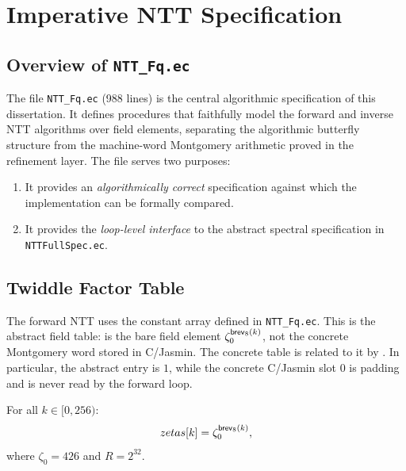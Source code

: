 
\chapter{Imperative NTT Specification}
\label{ch:ntt_spec}

\section{Overview of \texttt{NTT\_Fq.ec}}

The file \texttt{NTT\_Fq.ec} (988 lines) is the central algorithmic
specification of this dissertation.  It defines \easycrypt{} procedures that
faithfully model the forward and inverse NTT algorithms over field elements,
separating the algorithmic butterfly structure from the machine-word
Montgomery arithmetic proved in the refinement layer.  The file serves two
purposes:
\begin{enumerate}
  \item It provides an \emph{algorithmically correct} specification against
        which the \jasmin{} implementation can be formally compared.
  \item It provides the \emph{loop-level interface} to the abstract spectral
        specification in \texttt{NTTFullSpec.ec}.
\end{enumerate}

\section{Twiddle Factor Table}

The forward NTT uses the constant array
 defined in \texttt{NTT\_Fq.ec}.  This is the
abstract field table:  is the bare field element
$\zeta_0^{\mathsf{brev}_8(k)}$, not the concrete Montgomery word stored in C/Jasmin.
The concrete table is related to it by .  In particular,
the abstract entry  is $1$, while the concrete C/Jasmin slot 0
is padding and is never read by the forward loop.

\begin{lemma}
  For all $k \in [0, 256)$:
  \[
    zetas[k] = \zeta_0^{\mathsf{brev}_8(k)},
  \]
  where $\zeta_0 = 426$ and $R = 2^{32}$.
\label{lem:zetas_def}
\end{lemma}

